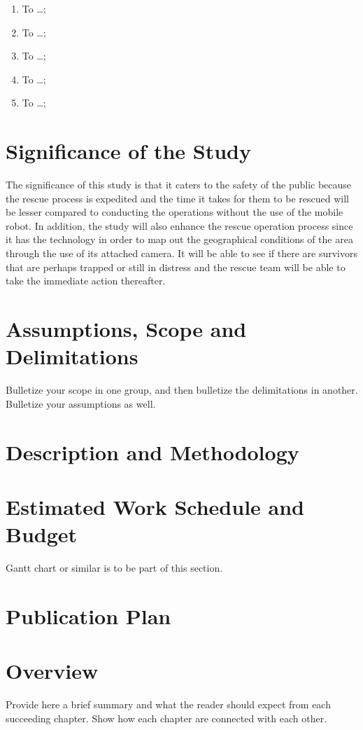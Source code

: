 \begin{enumerate}
	\item To  \ldots;
	
	\item To  \ldots;
	
	\item To  \ldots;
	
	\item To  \ldots;
	
	\item To  \ldots;
\end{enumerate}



\section{Significance of the Study}

	The significance of this study is that it caters to the safety of the public because the rescue process is expedited and the time it takes for them to be rescued will be lesser compared to conducting the operations without the use of the mobile robot. In addition, the study will also enhance the rescue operation process since it has the technology in order to map out the geographical conditions of the area through the use of its attached camera. It will be able to see if there are survivors that are perhaps trapped or still in distress and the rescue team will be able to take the immediate action thereafter.

\blindtext

\section{Assumptions, Scope and Delimitations}

Bulletize your scope in one group, and then bulletize the delimitations in another.  Bulletize your assumptions as well.


\section{Description and Methodology}

\blindtext


\ifFinished
\else

\section{Estimated Work Schedule and Budget}

Gantt chart or similar is to be part of this section.

\blindtext

\section{Publication Plan}
\blindtext

\fi


\section{Overview}

Provide here a brief summary and what the reader should expect from each succeeding chapter.  Show how each chapter are connected with each other.

